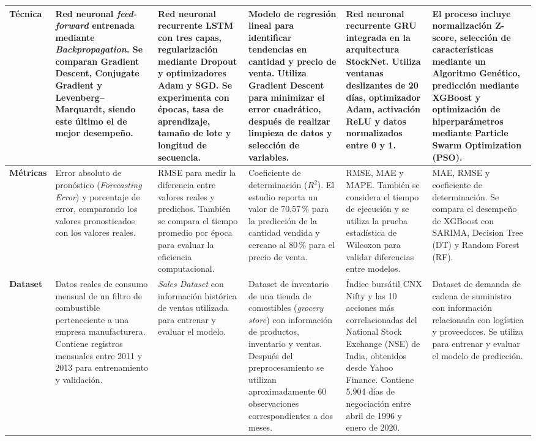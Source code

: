 \begin{table}[H]
{\begin{tabular}{|p{2.5cm}|p{4.5cm}|p{4.5cm}|p{4.5cm}|p{4.5cm}|p{4.5cm}|}
\textbf{Técnica} &
Red neuronal \textit{feed-forward} entrenada mediante \textit{Backpropagation}. Se comparan Gradient Descent, Conjugate Gradient y Levenberg--Marquardt, siendo este último el de mejor desempeño. &
Red neuronal recurrente LSTM con tres capas, regularización mediante Dropout y optimizadores Adam y SGD. Se experimenta con épocas, tasa de aprendizaje, tamaño de lote y longitud de secuencia. &
Modelo de regresión lineal para identificar tendencias en cantidad y precio de venta. Utiliza Gradient Descent para minimizar el error cuadrático, después de realizar limpieza de datos y selección de variables. &
Red neuronal recurrente GRU integrada en la arquitectura StockNet. Utiliza ventanas deslizantes de 20 días, optimizador Adam, activación ReLU y datos normalizados entre 0 y 1. &
El proceso incluye normalización Z-score, selección de características mediante un Algoritmo Genético, predicción mediante XGBoost y optimización de hiperparámetros mediante Particle Swarm Optimization (PSO). \\ 
\hline

\textbf{Métricas} &
Error absoluto de pronóstico (\textit{Forecasting Error}) y porcentaje de error, comparando los valores pronosticados con los valores reales. &
RMSE para medir la diferencia entre valores reales y predichos. También se compara el tiempo promedio por época para evaluar la eficiencia computacional. &
Coeficiente de determinación ($R^2$). El estudio reporta un valor de 70,57\,\% para la predicción de la cantidad vendida y cercano al 80\,\% para el precio de venta. &
RMSE, MAE y MAPE. También se considera el tiempo de ejecución y se utiliza la prueba estadística de Wilcoxon para validar diferencias entre modelos. &
MAE, RMSE y coeficiente de determinación. Se compara el desempeño de XGBoost con SARIMA, Decision Tree (DT) y Random Forest (RF). \\ 
\hline

\textbf{Dataset} &
Datos reales de consumo mensual de un filtro de combustible perteneciente a una empresa manufacturera. Contiene registros mensuales entre 2011 y 2013 para entrenamiento y validación. &
\textit{Sales Dataset} con información histórica de ventas utilizada para entrenar y evaluar el modelo. &
Dataset de inventario de una tienda de comestibles (\textit{grocery store}) con información de productos, inventario y ventas. Después del preprocesamiento se utilizan aproximadamente 60 observaciones correspondientes a dos meses. &
Índice bursátil CNX Nifty y las 10 acciones más correlacionadas del National Stock Exchange (NSE) de India, obtenidos desde Yahoo Finance. Contiene 5.904 días de negociación entre abril de 1996 y enero de 2020. &
Dataset de demanda de cadena de suministro con información relacionada con logística y proveedores. Se utiliza para entrenar y evaluar el modelo de predicción. \\ 
\hline


\end{tabular}}
\end{table}
